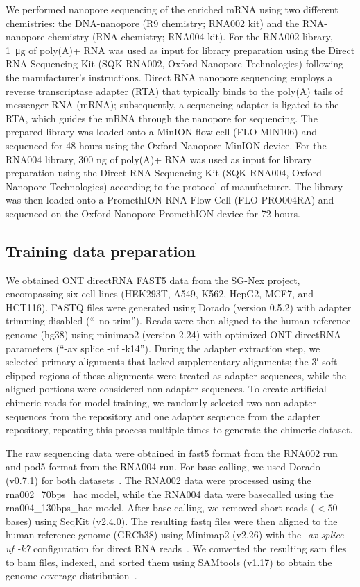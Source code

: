 \documentclass[pdflatex, sn-mathphys-num, lineno]{sn-jnl}%
\theoremstyle{thmstyleone}%
\theoremstyle{thmstyletwo}%
\theoremstyle{thmstylethree}%
\begin{document}
We performed nanopore sequencing of the enriched mRNA using two different chemistries: the DNA-nanopore (R9 chemistry; RNA002 kit) and the RNA-nanopore chemistry (RNA chemistry; RNA004 kit).
For the RNA002 library, \SI{1}{\micro\gram} of poly(A)+ RNA was used as input for library preparation using the Direct RNA Sequencing Kit (SQK-RNA002, Oxford Nanopore Technologies) following the manufacturer's instructions.
Direct RNA nanopore sequencing employs a reverse transcriptase adapter (RTA) that typically binds to the poly(A) tails of messenger RNA (mRNA); subsequently, a sequencing adapter is ligated to the RTA, which guides the mRNA through the nanopore for sequencing.
The prepared library was loaded onto a MinION flow cell (FLO-MIN106) and sequenced for 48 hours using the Oxford Nanopore MinION device.
For the RNA004 library, 300 ng of poly(A)+ RNA was used as input for library preparation using the Direct RNA Sequencing Kit (SQK-RNA004, Oxford Nanopore Technologies) according to the protocol of manufacturer.
The library was then loaded onto a PromethION RNA Flow Cell (FLO-PRO004RA) and sequenced on the Oxford Nanopore PromethION device for 72 hours.


\subsection{Training data preparation}\label{ssec:data}


We obtained ONT directRNA FAST5 data from the SG-Nex project, encompassing six cell lines (HEK293T, A549, K562, HepG2, MCF7, and HCT116). FASTQ files were generated using Dorado (version 0.5.2) with adapter trimming disabled (“--no-trim”). Reads were then aligned to the human reference genome (hg38) using minimap2 (version 2.24) with optimized ONT directRNA parameters (“-ax splice -uf -k14”). During the adapter extraction step, we selected primary alignments that lacked supplementary alignments; the 3′ soft-clipped regions of these alignments were treated as adapter sequences, while the aligned portions were considered non-adapter sequences. To create artificial chimeric reads for model training, we randomly selected two non-adapter sequences from the repository and one adapter sequence from the adapter repository, repeating this process multiple times to generate the chimeric dataset.


The raw sequencing data were obtained in fast5 format from the RNA002 run and pod5 format from the RNA004 run.
For base calling, we used Dorado (v0.7.1) for both datasets~\cite{dorado2023}.
The RNA002 data were processed using the rna002\_70bps\_hac model, while the RNA004 data were basecalled using the rna004\_130bps\_hac model.
After base calling, we removed short reads (\( < 50 \) bases) using SeqKit (v2.4.0).
The resulting fastq files were then aligned to the human reference genome (GRCh38) using Minimap2 (v2.26) with the \textit{-ax splice -uf -k7} configuration for direct RNA reads~\cite{li2018minimap2}.
We converted the resulting sam files to bam files, indexed, and sorted them using SAMtools (v1.17) to obtain the genome coverage distribution~\cite{li2009sequence}.
\end{document}
